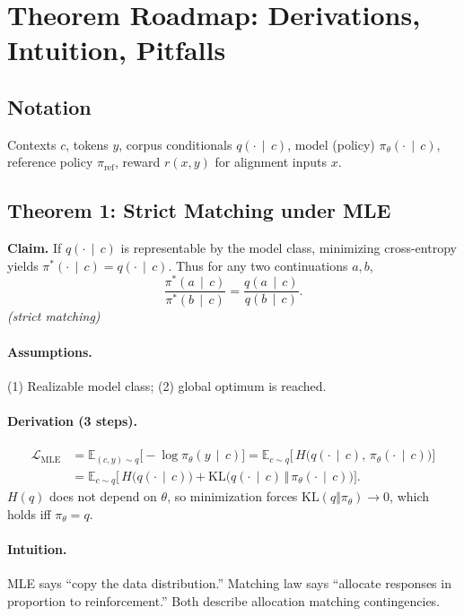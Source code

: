 \documentclass[11pt]{article}
\newcommand{\E}{\mathbb{E}}
\newcommand{\KL}{\mathrm{KL}}
\newcommand{\given}{\,\mid\,}
\begin{document}
\section{Theorem Roadmap: Derivations, Intuition, Pitfalls}

\subsection*{Notation}
Contexts $c$, tokens $y$, corpus conditionals $q(\cdot\given c)$, model (policy) $\pi_\theta(\cdot\given c)$, reference policy $\pi_{\mathrm{ref}}$, reward $r(x,y)$ for alignment inputs $x$.

\subsection{Theorem 1: Strict Matching under MLE}
\textbf{Claim.} If $q(\cdot\given c)$ is representable by the model class, minimizing cross-entropy yields $\pi^*(\cdot\given c)=q(\cdot\given c)$. Thus for any two continuations $a,b$,
\begin{equation*}
\frac{\pi^*(a\given c)}{\pi^*(b\given c)}=\frac{q(a\given c)}{q(b\given c)}.
\end{equation*}
\noindent\emph{(strict matching)}

\paragraph{Assumptions.}
(1) Realizable model class; (2) global optimum is reached.

\paragraph{Derivation (3 steps).}
\begin{align*}
\mathcal{L}_{\mathrm{MLE}}
&= \E_{(c,y)\sim q}\big[-\log \pi_{\theta}(y\given c)\big]
= \E_{c\sim q}\Big[\,H\big(q(\cdot\given c),\,\pi_{\theta}(\cdot\given c)\big)\Big]\\
&= \E_{c\sim q}\Big[\,H\big(q(\cdot\given c)\big) + \KL\!\big(q(\cdot\given c)\,\Vert\,\pi_{\theta}(\cdot\given c)\big)\Big].
\end{align*}
$H(q)$ does not depend on $\theta$, so minimization forces $\KL(q\Vert \pi_\theta)\to 0$, which holds iff $\pi_\theta=q$.

\paragraph{Intuition.} MLE says “copy the data distribution.” Matching law says “allocate responses in proportion to reinforcement.” Both describe allocation matching contingencies.
\end{document}
